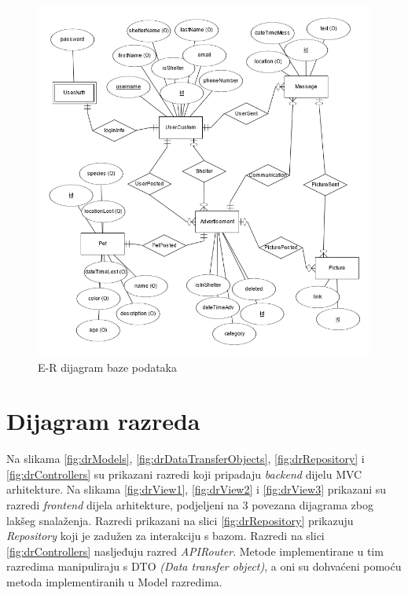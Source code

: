 				\begin{figure}[H]
					\includegraphics[scale=0.65]{dijagrami/dijagramBaze/ERmodel.PNG} %
					\centering
					\caption{E-R dijagram baze podataka}
					\label{fig:erDijagram}
				\end{figure}

			\eject
			
			
		\section{Dijagram razreda}
		
			Na slikama \ref{fig:drModels}, \ref{fig:drDataTransferObjects}, \ref{fig:drRepository} i \ref{fig:drControllers} su prikazani razredi koji pripadaju \textit{backend} dijelu MVC arhitekture. Na slikama \ref{fig:drView1}, \ref{fig:drView2} i \ref{fig:drView3} prikazani su razredi \textit{frontend} dijela arhitekture, podjeljeni na 3 povezana dijagrama zbog lakšeg snalaženja. Razredi prikazani na slici \ref{fig:drRepository} prikazuju \textit{Repository} koji je zadužen za interakciju s bazom. Razredi na slici \ref{fig:drControllers} nasljeđuju razred \textit{APIRouter}. Metode implementirane u tim razredima manipuliraju s DTO \textit{(Data transfer object)}, a oni su dohvaćeni pomoću metoda implementiranih u Model razredima.

